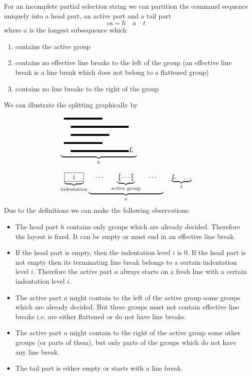 \documentclass[12pt]{article}
\def\GS{\,[\![\,}
\def\GE{\,]\!]\,}
\begin{document}
For an incomplete partial selection string we can partition the command
sequence uniquely into a head part, an active part and a tail part
$$
\text{cs} = h \quad a \quad t
$$
where $a$ is the longest subsequence which
\begin{enumerate}
\item contains the active group

\item contains no effective line breaks to the left of the group (an effective
  line break is a line break which does not belong to a flattened group)

\item contains no line breaks to the right of the group
\end{enumerate}
We can illustrate the splitting graphically by
{
  \newcommand{\mline}[1]{\text{\rule{#1mm}{1mm}}}
    $$%
    \begin{array}{l}
      \underbrace{
      \begin{array}{l}
        \mline{20} \\
        \quad\mline{30}\\
        \quad\mline{20}\\
        \mline{20} \\
        \quad\mline{30}L
      \end{array}}_h
      \\
      \\
      \underbrace{\text{\framebox[10mm][c]{i}}}_\text{indentation}
      \underbrace{\quad \cdots \quad
         \underbrace{\GS\cdots\GE}_\text{active group}
      \quad \cdots \quad}_a \quad
      \underbrace{L \quad \ldots}_t

    \end{array}
    $$
}
Due to the definitions we can make the following observations:
\begin{itemize}
\item The head part $h$ contains only groups which are already
  decided. Therefore the layout is fixed. It can be empty or must end in an
  effective line break.

\item If the head part is empty, then the indentation level $i$ is $0$. If the
  head part is not empty then its terminating line break belongs to a certain
  indentation level $i$. Therefore the active part $a$ always starts on a
  fresh line with a certain indentation level $i$.

\item The active part $a$ might contain to the left of the active group some
  groups which are already decided. But these groups must not contain
  effective line breaks i.e. are either flattened or do not have line breaks.

\item The active part $a$ might contain to the right of the active group some
  other groups (or parts of them), but only parts of the groups which do not
  have any line break.

\item The tail part is either empty or starts with a line break.
\end{itemize}
\end{document}
